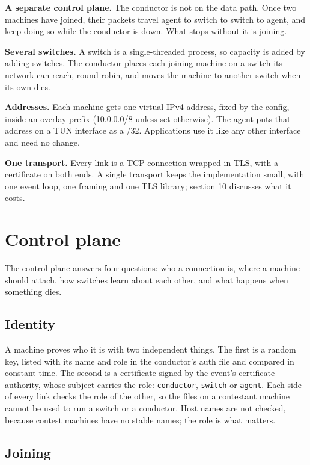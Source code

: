 \documentclass[11pt,a4paper]{article}
\begin{document}
\textbf{A separate control plane.} The conductor is not on the data path. Once two machines have joined, their packets travel agent to switch to switch to agent, and keep doing so while the conductor is down. What stops without it is joining.

\textbf{Several switches.} A switch is a single-threaded process, so capacity is added by adding switches. The conductor places each joining machine on a switch its network can reach, round-robin, and moves the machine to another switch when its own dies.

\textbf{Addresses.} Each machine gets one virtual IPv4 address, fixed by the config, inside an overlay prefix (10.0.0.0/8 unless set otherwise). The agent puts that address on a TUN interface as a /32. Applications use it like any other interface and need no change.

\textbf{One transport.} Every link is a TCP connection wrapped in TLS, with a certificate on both ends. A single transport keeps the implementation small, with one event loop, one framing and one TLS library; section 10 discusses what it costs.

\hypertarget{control-plane}{%
\section{Control plane}\label{control-plane}}

The control plane answers four questions: who a connection is, where a machine should attach, how switches learn about each other, and what happens when something dies.

\hypertarget{identity}{%
\subsection{Identity}\label{identity}}

A machine proves who it is with two independent things. The first is a random key, listed with its name and role in the conductor's auth file and compared in constant time. The second is a certificate signed by the event's certificate authority, whose subject carries the role: \texttt{conductor}, \texttt{switch} or \texttt{agent}. Each side of every link checks the role of the other, so the files on a contestant machine cannot be used to run a switch or a conductor. Host names are not checked, because contest machines have no stable names; the role is what matters.

\hypertarget{joining}{%
\subsection{Joining}\label{joining}}
\end{document}
